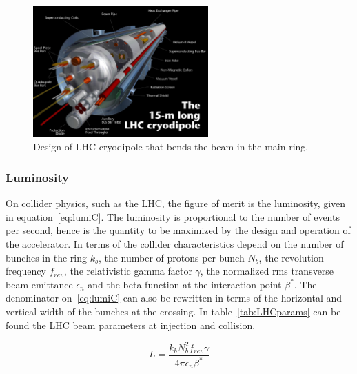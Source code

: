 \begin{figure}[!Hhtbp]
  \begin{center}
    \includegraphics[width=0.6\textwidth]{figs/cryodipole.jpg}
    \caption{Design of LHC cryodipole that bends the beam in the main ring.}
    \label{fig:dipole}
  \end{center}
\end{figure}

\subsubsection{Luminosity}
\label{sec:lumi}

On collider physics, such as the LHC, the figure of merit is the luminosity, given in equation~\ref{eq:lumiC}. The luminosity is proportional to the number of events per second, hence is the quantity to be maximized by the design and operation of the accelerator. In terms of the collider characteristics depend on the number of bunches in the ring $k_{b}$, the number of protons per bunch $N_{b}$, the revolution frequency $f_{rev}$, the relativistic gamma factor $\gamma$, the normalized rms transverse beam emittance $\epsilon_{n}$ and the beta function at the interaction point $\beta^{*}$. The denominator on~\ref{eq:lumiC} can also be rewritten in terms of the horizontal and vertical width of the bunches at the crossing. In table~\ref{tab:LHCparams} can be found the LHC beam parameters at injection and collision.  

\begin{equation}
  \label{eq:lumiC}
  L=\frac{k_{b}N_{b}^{2}f_{rev}\gamma}{4\pi\epsilon_{n}\beta^{*}}
\end{equation}

